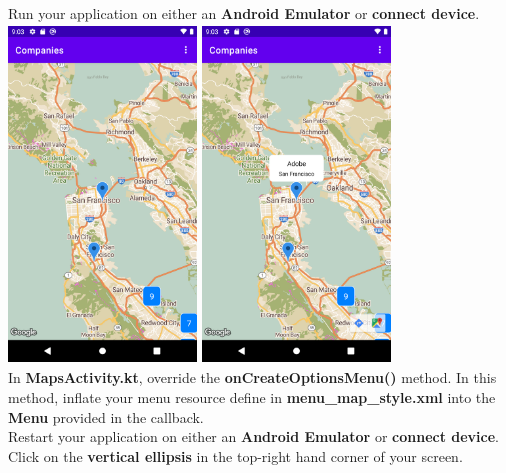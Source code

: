 \documentclass{article}
\begin{document}
Run your application on either an \textbf{Android Emulator} or \textbf{connect device}. \\ 

\includegraphics[width=5cm, height=9cm]{../tex/img/practicals/05-companies-2.png} 
\includegraphics[width=5cm, height=9cm]{../tex/img/practicals/05-companies-3.png} \\

In \textbf{MapsActivity.kt}, override the \textbf{onCreateOptionsMenu()} method. In this method, inflate your menu resource define in \textbf{menu\_map\_style.xml} into the \textbf{Menu} provided in the callback. \\

Restart your application on either an \textbf{Android Emulator} or \textbf{connect device}. Click on the \textbf{vertical ellipsis} in the top-right hand corner of your screen. \\ 
\end{document}
